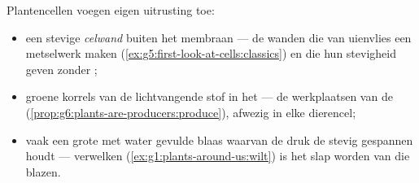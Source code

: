 \begin{proposition}\label{prop:g6:cell-unit-of-life:plantextras}
Plantencellen voegen eigen uitrusting toe:
\begin{itemize}
  \item een stevige \emph{celwand} buiten het membraan
        --- de wanden die van uienvlies een metselwerk maken
        (\cref{ex:g5:first-look-at-cells:classics}) en die  hun
        stevigheid geven zonder ;
  \item groene korrels van de lichtvangende stof in het  ---
        de werkplaatsen van de 
        (\cref{prop:g6:plants-are-producers:produce}), afwezig in elke
        dierencel;
  \item vaak een grote met water gevulde blaas waarvan de druk de 
        stevig gespannen houdt --- verwelken
        (\cref{ex:g1:plants-around-us:wilt}) is het slap worden van die
        blazen.
\end{itemize}
\end{proposition}
\admitted


